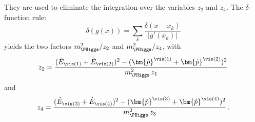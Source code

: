 They are used to eliminate the integration over the variables $z_{2}$ and $z_{4}$.
The $\delta$-function rule:
\begin{equation*} 
\delta \left( g(x) \right) = \sum_{k} \frac{\delta \left( x - x_{k}
  \right)}{\vert g'(x_{k}) \vert} 
\end{equation*}
yields the two factors $m_{\PHiggs}^{2}/z_{2}$ and $m_{\PHiggs}^{2}/z_{4}$,
with 
\begin{equation*}
z_{2} = \frac{(\hat{E}_{\vis(1)} + \hat{E}_{\vis(2)})^{2} - (\bm{\hat{p}}^{\vis(1)} + \bm{\hat{p}}^{\vis(2)})^{2}}{m_{\PHiggs}^{2} \, z_{1}}
\end{equation*}
and 
\begin{equation*} 
z_{4} = \frac{(\hat{E}_{\vis(3)} + \hat{E}_{\vis(4)})^{2} - (\bm{\hat{p}}^{\vis(3)} + \bm{\hat{p}}^{\vis(4)})^{2}}{m_{\PHiggs}^{2} \, z_{3}} \, .
\end{equation*}

